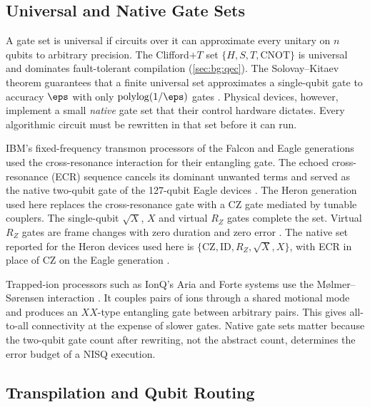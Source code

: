 \subsection{Universal and Native Gate Sets}

A gate set is universal if circuits over it can approximate every unitary on $n$ qubits to arbitrary precision. The Clifford$+T$ set $\{H,S,T,\mathrm{CNOT}\}$ is universal and dominates fault-tolerant compilation (\cref{sec:bg:qec}). The Solovay--Kitaev theorem guarantees that a finite universal set approximates a single-qubit gate to accuracy $\eps$ with only $\mathrm{polylog}(1/\eps)$ gates \cite{nielsen2010qcqi}. Physical devices, however, implement a small \emph{native} gate set that their control hardware dictates. Every algorithmic circuit must be rewritten in that set before it can run.

IBM's fixed-frequency transmon processors of the Falcon and Eagle generations used the cross-resonance interaction for their entangling gate. The echoed cross-resonance (ECR) sequence cancels its dominant unwanted terms and served as the native two-qubit gate of the 127-qubit Eagle devices \cite{sheldon2016echoedcr,bravyi2022futuresc}. The Heron generation used here replaces the cross-resonance gate with a CZ gate mediated by tunable couplers. The single-qubit $\sqrt{X}$, $X$ and virtual $R_Z$ gates complete the set. Virtual $R_Z$ gates are frame changes with zero duration and zero error \cite{mckay2017virtualz}. The native set reported for the Heron devices used here is $\{\mathrm{CZ},\mathrm{ID},R_Z,\sqrt{X},X\}$, with ECR in place of CZ on the Eagle generation \cite{guo2026rubriq}.

Trapped-ion processors such as IonQ's Aria and Forte systems use the M{\o}lmer--S{\o}rensen interaction \cite{sorensen1999ms}. It couples pairs of ions through a shared motional mode and produces an $XX$-type entangling gate between arbitrary pairs. This gives all-to-all connectivity at the expense of slower gates. Native gate sets matter because the two-qubit gate count after rewriting, not the abstract count, determines the error budget of a NISQ execution.

\subsection{Transpilation and Qubit Routing}

